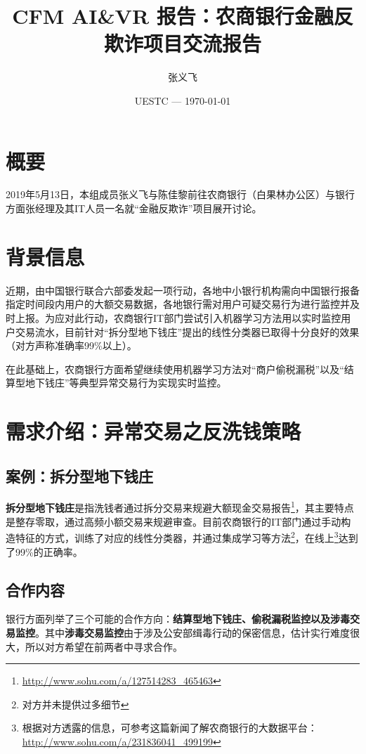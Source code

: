 \documentclass{article}
\title{CFM AI\&VR 报告：农商银行金融反欺诈项目交流报告}
\author{张义飞}
\date{UESTC --- \today}
\begin{document}
\maketitle

\section{概要}
2019年5月13日，本组成员张义飞与陈佳黎前往农商银行（白果林办公区）与银行方面张经理及其IT人员一名就“金融反欺诈”项目展开讨论。

\section{背景信息}
近期，由中国银行联合六部委发起一项行动，各地中小银行机构需向中国银行报备指定时间段内用户的大额交易数据，各地银行需对用户可疑交易行为进行监控并及时上报。为应对此行动，农商银行IT部门尝试引入机器学习方法用以实时监控用户交易流水，目前针对“拆分型地下钱庄”提出的线性分类器已取得十分良好的效果（对方声称准确率99\%以上）。

在此基础上，农商银行方面希望继续使用机器学习方法对“商户偷税漏税”以及“结算型地下钱庄”等典型异常交易行为实现实时监控。

\section{需求介绍：异常交易之反洗钱策略}
\subsection{案例：拆分型地下钱庄}
\textbf{拆分型地下钱庄}是指洗钱者通过拆分交易来规避大额现金交易报告\footnote{\url{http://www.sohu.com/a/127514283_465463}}，其主要特点是整存零取，通过高频小额交易来规避审查。目前农商银行的IT部门通过手动构造特征的方式，训练了对应的线性分类器，并通过集成学习等方法\footnote{对方并未提供过多细节}，在线上\footnote{根据对方透露的信息，可参考这篇新闻了解农商银行的大数据平台：\url{http://www.sohu.com/a/231836041_499199}}达到了99\%的正确率。

\subsection{合作内容}
银行方面列举了三个可能的合作方向：\textbf{结算型地下钱庄、偷税漏税监控以及涉毒交易监控}。其中\textbf{涉毒交易监控}由于涉及公安部缉毒行动的保密信息，估计实行难度很大，所以对方希望在前两者中寻求合作。
\end{document}
